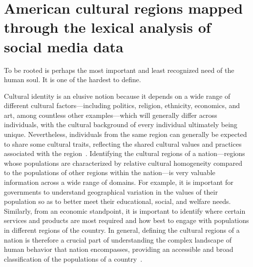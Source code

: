 \documentclass[../thesis.tex]{subfiles}
\begin{document}
\chapter{American cultural regions mapped through the lexical analysis of social media data}
\label{ch:acr}

\epigraph{
  To be rooted is perhaps the most important and least recognized need of the
  human soul. It is one of the hardest to define.
}{
}


Cultural identity is an elusive notion because it depends on a wide range of different
cultural factors---including politics, religion, ethnicity, economics, and art, among
countless other examples---which will generally differ across individuals, with the
cultural background of every individual ultimately being unique. Nevertheless,
individuals from the same region can generally be expected to share some cultural
traits, reflecting the shared cultural values and practices associated with the
region~\cite{broek1973geography}. Identifying the cultural regions of a nation---regions
whose populations are characterized by relative cultural homogeneity compared to the
populations of other regions within the nation---is very valuable information across a
wide range of domains. For example, it is important for governments to understand
geographical variation in the values of their population so as to better meet their
educational, social, and welfare needs. Similarly, from an economic standpoint, it is
important to identify where certain services and products are most required and how best
to engage with populations in different regions of the country. In general, defining the
cultural regions of a nation is therefore a crucial part of understanding the complex
landscape of human behavior that nation encompasses, providing an accessible and broad
classification of the populations of a country~\cite{lane2016culture}.
\end{document}
